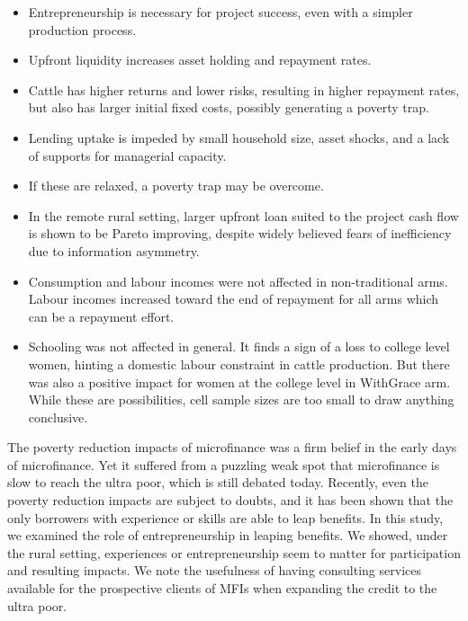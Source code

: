 \begin{mdframed}[style={SecItemize}, frametitle={Conclusion}]
\begin{itemize}
\vspace{1.0ex}\setlength{\itemsep}{1.0ex}\setlength{\baselineskip}{12pt}
\item	Entrepreneurship is necessary for project success, even with a simpler production process.
\item	Upfront liquidity increases asset holding and repayment rates.
\item	Cattle has higher returns and lower risks, resulting in higher repayment rates, but also has larger initial fixed costs, possibly generating a poverty trap.
\item	Lending uptake is impeded by small household size, asset shocks, and a lack of supports for managerial capacity.
\item	If these are relaxed, a poverty trap may be overcome.
\item	In the remote rural setting, larger upfront loan suited to the project cash flow is shown to be Pareto improving, despite widely believed fears of inefficiency due to information asymmetry.
\item	Consumption and labour incomes were not affected in non-\textsf{traditional} arms. Labour incomes increased toward the end of repayment for all arms which can be a repayment effort.
\item	Schooling was not affected in general. It finds a sign of a loss to college level women, hinting a domestic labour constraint in cattle production. But there was also a positive impact for women at the college level in \textsf{WithGrace} arm. While these are possibilities, cell sample sizes are too small to draw anything conclusive.
\end{itemize}
\end{mdframed}

	The poverty reduction impacts of microfinance was a firm belief in the early days of microfinance. Yet it suffered from a puzzling weak spot that microfinance is slow to reach the ultra poor, which is still debated today. Recently, even the poverty reduction impacts are subject to doubts, and it has been shown that the only borrowers with experience or skills are able to leap benefits. In this study, we examined the role of entrepreneurship in leaping benefits. We showed, under the rural setting, experiences or entrepreneurship seem to matter for participation and resulting impacts. We note the usefulness of having consulting services available for the prospective clients of MFIs when expanding the credit to the ultra poor. 


